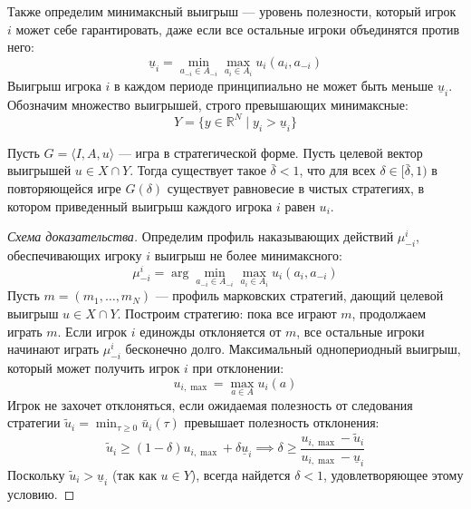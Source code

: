 Также определим минимаксный выигрыш — уровень полезности, который игрок $i$ может себе гарантировать, даже если все остальные игроки объединятся против него:
\begin{equation}
    \underline{u}_i = \min_{a_{-i} \in A_{-i}} \max_{a_i \in A_i} u_i(a_i, a_{-i})
\end{equation}
Выигрыш игрока $i$ в каждом периоде принципиально не может быть меньше $\underline{u}_i$. Обозначим множество выигрышей, строго превышающих минимаксные:
\begin{equation}
    Y = \{ y \in \mathbb{R}^N \mid y_i > \underline{u}_i \}
\end{equation}

\begin{theorem}
Пусть $G = \langle I, A, u \rangle$ — игра в стратегической форме. Пусть целевой вектор выигрышей $u \in X \cap Y$. Тогда существует такое $\bar{\delta} < 1$, что для всех $\delta \in [\bar{\delta}, 1)$ в повторяющейся игре $G(\delta)$ существует равновесие в чистых стратегиях, в котором приведенный выигрыш каждого игрока $i$ равен $u_i$.
\end{theorem}

\begin{proof}[Схема доказательства]
Определим профиль наказывающих действий $\mu_{-i}^i$, обеспечивающих игроку $i$ выигрыш не более минимаксного:
\begin{equation}
    \mu_{-i}^i = \arg\min_{a_{-i} \in A_{-i}} \max_{a_i \in A_i} u_i(a_i, a_{-i})
\end{equation}
Пусть $m = (m_1, \dots, m_N)$ — профиль марковских стратегий, дающий целевой выигрыш $u \in X \cap Y$. Построим стратегию: пока все играют $m$, продолжаем играть $m$. Если игрок $i$ единожды отклоняется от $m$, все остальные игроки начинают играть $\mu_{-i}^i$ бесконечно долго.
Максимальный однопериодный выигрыш, который может получить игрок $i$ при отклонении:
\begin{equation}
    u_{i,\max} = \max_{a \in A} u_i(a)
\end{equation}
Игрок не захочет отклоняться, если ожидаемая полезность от следования стратегии $\tilde{u}_i = \min_{\tau \ge 0} \bar{u}_i(\tau)$ превышает полезность отклонения:
\begin{equation}
    \tilde{u}_i \ge (1 - \delta) u_{i,\max} + \delta \underline{u}_i \implies \delta \ge \frac{u_{i,\max} - \tilde{u}_i}{u_{i,\max} - \underline{u}_i}
\end{equation}
Поскольку $\tilde{u}_i > \underline{u}_i$ (так как $u \in Y$), всегда найдется $\delta < 1$, удовлетворяющее этому условию.
\end{proof}

